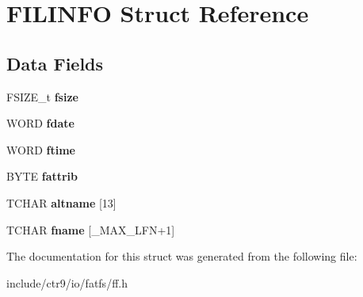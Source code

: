 \hypertarget{struct_f_i_l_i_n_f_o}{}\section{F\+I\+L\+I\+N\+FO Struct Reference}
\label{struct_f_i_l_i_n_f_o}
\subsection*{Data Fields}
\begin{DoxyCompactItemize}
\item 
F\+S\+I\+Z\+E\+\_\+t {\bfseries fsize}\hypertarget{struct_f_i_l_i_n_f_o_a9e5b78ed7190f73de3ebcbdfbd6d1844}{}\label{struct_f_i_l_i_n_f_o_a9e5b78ed7190f73de3ebcbdfbd6d1844}

\item 
W\+O\+RD {\bfseries fdate}\hypertarget{struct_f_i_l_i_n_f_o_a7c01c48a15b1b49da459924437b0bd52}{}\label{struct_f_i_l_i_n_f_o_a7c01c48a15b1b49da459924437b0bd52}

\item 
W\+O\+RD {\bfseries ftime}\hypertarget{struct_f_i_l_i_n_f_o_ae0f751b79621bf7b29669f177bbe6b9a}{}\label{struct_f_i_l_i_n_f_o_ae0f751b79621bf7b29669f177bbe6b9a}

\item 
B\+Y\+TE {\bfseries fattrib}\hypertarget{struct_f_i_l_i_n_f_o_a838d542585831b085537b363f18205c0}{}\label{struct_f_i_l_i_n_f_o_a838d542585831b085537b363f18205c0}

\item 
T\+C\+H\+AR {\bfseries altname} \mbox{[}13\mbox{]}\hypertarget{struct_f_i_l_i_n_f_o_a37243296fadacbde8500b5668d99682e}{}\label{struct_f_i_l_i_n_f_o_a37243296fadacbde8500b5668d99682e}

\item 
T\+C\+H\+AR {\bfseries fname} \mbox{[}\+\_\+\+M\+A\+X\+\_\+\+L\+FN+1\mbox{]}\hypertarget{struct_f_i_l_i_n_f_o_a7c3ce2dd03dc9a9726967fc43116079f}{}\label{struct_f_i_l_i_n_f_o_a7c3ce2dd03dc9a9726967fc43116079f}

\end{DoxyCompactItemize}


The documentation for this struct was generated from the following file\+:\begin{DoxyCompactItemize}
\item 
include/ctr9/io/fatfs/ff.\+h\end{DoxyCompactItemize}
